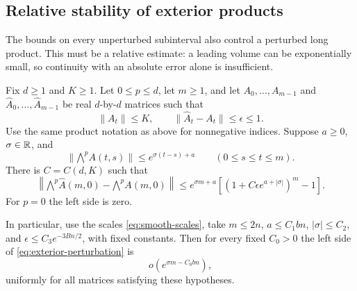 \subsection{Relative stability of exterior products}

The bounds on every unperturbed subinterval also control a perturbed
long product.  This must be a relative estimate: a leading volume can
be exponentially small, so continuity with an absolute error alone is
insufficient.

\begin{lemma}\label{lem:relative-exterior}
Fix $d\geq1$ and $K\geq1$.  Let $0\leq p\leq d$, let $m\geq1$,
and let $A_0,\ldots,A_{m-1}$ and
$\widehat A_0,\ldots,\widehat A_{m-1}$ be real $d$-by-$d$ matrices
such that
\[
 \|A_t\|\leq K,\qquad
 \|\widehat A_t-A_t\|\leq\epsilon\leq1.
\]
Use the same product notation as above for nonnegative indices.
Suppose $a\geq0$, $\sigma\in\mathbb R$, and
\[
 \|\mathord{\bigwedge}^p A(t,s)\|
       \leq e^{\sigma(t-s)+a}
 \qquad(0\leq s\leq t\leq m).
\]
There is $C=C(d,K)$ such that
\begin{equation}\label{eq:exterior-perturbation}
 \left\|\mathord{\bigwedge}^p\widehat A(m,0)
             -\mathord{\bigwedge}^p A(m,0)\right\|
 \leq e^{\sigma m+a}
       \left[(1+C\epsilon e^{a+|\sigma|})^m-1\right].
\end{equation}
For $p=0$ the left side is zero.

In particular, use the scales \eqref{eq:smooth-scales}, take
$m\leq2n$, $a\leq C_1bn$, $|\sigma|\leq C_2$, and
$\epsilon\leq C_3e^{-3Bn/2}$, with fixed constants.
Then for every fixed $C_0>0$ the left side of
\eqref{eq:exterior-perturbation} is
\begin{equation}\label{eq:relative-exterior-small}
 o\!\left(e^{\sigma m-C_0bn}\right),
\end{equation}
uniformly for all matrices satisfying these hypotheses.
\end{lemma}

